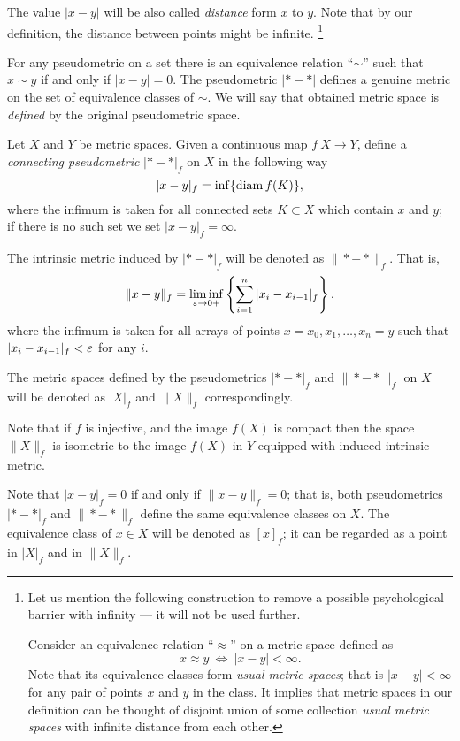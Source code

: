 \documentclass[a4paper,10pt]{amsart}
\begin{document}
The value $|x-y|$ will be also called \emph{distance} form $x$ to $y$.
Note that by our definition, the distance between points might be infinite.%
\footnote{Let us mention the following construction to remove a possible psychological barrier with infinity --- it will not be used further.

Consider an equivalence relation ``$\approx$'' on a metric space defined as \[x\approx y\  \iff\  |x-y|<\infty.\]
Note that its equivalence classes form \emph{usual metric spaces}; 
that is $|x-y|<\infty$ for any pair of points $x$ and $y$ in the class.
It implies that metric spaces in our definition 
can be thought of disjoint union of some collection \emph{usual metric spaces} with infinite distance from each other.}

For any pseudometric on a set 
there is an equivalence relation ``$\sim$''
such that $x\sim y$ if and only if $|x-y|=0$.
The pseudometric $|{*}-{*}|$ defines a genuine metric on the set of equivalence classes of $\sim$.
We will say that obtained metric space is \emph{defined} by the  original pseudometric space.%

Let $X$ and $Y$ be metric spaces.
Given a continuous map $f\:X\to Y$,
define a \emph{connecting pseudometric} $|{*}-{*}|_f$ on $X$ in
the following way
\[|x-y|_f=\inf\{\mathop{\rm diam}\nolimits f(K)\},\]
where the infimum is taken for all connected sets $K\subset X$ which contain $x$ and $y$;
if there is no such set we set $|x-y|_f=\infty$.

The intrinsic metric induced by $|{*}-{*}|_f$ will be denoted as 
$\|{*}-{*}\|_f$. 
That is, 
\[\|x-y\|_f=\liminf_{\varepsilon\to0+}\left\{\sum_{i=1}^n|x_i-x_{i-1}|_f\right\}.\]
where the infimum is taken for all arrays of points 
$x=x_0,x_1,\dots,x_n=y$ such that 
$|x_i-x_{i-1}|_f<\varepsilon$ for any $i$.

The metric spaces defined by the pseudometrics $|{*}-{*}|_f$ 
and $\|{*}-{*}\|_f$ on $X$ will be denoted as $|X|_f$ and $\|X\|_f$ correspondingly.

Note that if $f$ is injective, and the image $f(X)$ is compact then 
the space $\|X\|_f$ is isometric to the image $f(X)$ in $Y$ equipped with induced intrinsic metric.

Note that $|x-y|_f=0$ if and only if $\|x-y\|_f=0$;
that is,  both pseudometrics $|{*}-{*}|_f$ and  $\|{*}-{*}\|_f$
define the same equivalence classes on $X$.
The equivalence class of $x\in X$ will be denoted as $[x]_f$; 
it can be regarded as a point in  $|X|_f$ and in $\|X\|_f$.
\end{document}
